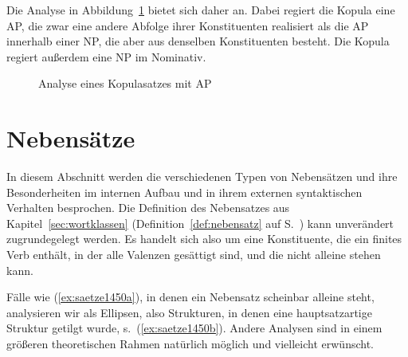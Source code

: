 \begin{exe}
\end{exe}

Die Analyse in Abbildung~\ref{fig:kopulav22} bietet sich daher an.
Dabei regiert die Kopula eine AP, die zwar eine andere Abfolge ihrer Konstituenten realisiert als die AP innerhalb einer NP, die aber aus denselben Konstituenten besteht.
Die Kopula regiert außerdem eine NP im Nominativ.

\begin{figure}
  \caption{Analyse eines Kopulasatzes mit AP}
  \label{fig:kopulav22}
\end{figure}

\section{Nebensätze}

\label{sec:nebensaetze}

In diesem Abschnitt werden die verschiedenen Typen von Nebensätzen und ihre Besonderheiten im internen Aufbau und in ihrem externen syntaktischen Verhalten besprochen.
Die Definition des Nebensatzes aus Kapitel~\ref{sec:wortklassen} (Definition~\ref{def:nebensatz} auf S.~\pageref{def:nebensatz}) kann unverändert zugrundegelegt werden.
Es handelt sich also um eine Konstituente, die ein finites Verb enthält, in der alle Valenzen gesättigt sind, und die nicht alleine stehen kann.

Fälle wie (\ref{ex:saetze1450a}), in denen ein Nebensatz scheinbar alleine steht, analysieren wir als Ellipsen, also Strukturen, in denen eine hauptsatzartige Struktur getilgt wurde, s.\ (\ref{ex:saetze1450b}).
Andere Analysen sind in einem größeren theoretischen Rahmen natürlich möglich und vielleicht erwünscht.

\begin{exe}
  \ex\label{ex:saetze1450} 
  \begin{xlist}
  \end{xlist}
\end{exe}

